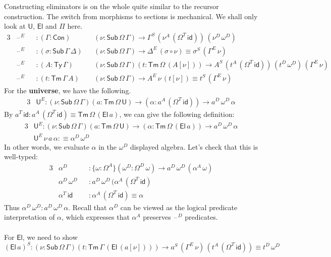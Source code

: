 \documentclass[12pt,a4paper,twoside,openany]{book}
\theoremstyle{remark}
\theoremstyle{definition}
\theoremstyle{theorem}
\newcommand{\id}{\mathsf{id}}
\newcommand{\Con}{\mathsf{Con}}
\newcommand{\Sub}{\mathsf{Sub}}
\newcommand{\Tm}{\mathsf{Tm}}
\newcommand{\Ty}{\mathsf{Ty}}
\newcommand{\U}{\mathsf{U}}
\newcommand{\El}{\mathsf{El}}
\newcommand{\blank}{\mathord{\hspace{1pt}\text{--}\hspace{1pt}}}
\newcommand{\defn}{:\equiv}
\begin{document}
Constructing eliminators is on the whole quite similar to the recursor
construction. The switch from morphisms to sections is mechanical. We shall only
look at $\U$, $\El$ and $\Pi$ here.
\begin{alignat*}{3}
  &\blank^E &&: (\Gamma : \Con)&&(\nu : \Sub\,\Omega\,\Gamma) \to \Gamma^S\,(\nu^A\,(\Omega^T\,\id))\,(\nu^D\,\omega^D)\\
  &\blank^E &&: (\sigma : \Sub\,\Gamma\,\Delta)&&(\nu : \Sub\,\Omega\,\Gamma) \to \Delta^E\,(\sigma \circ \nu) \equiv \sigma^S\,(\Gamma^E\,\nu)\\
  &\blank^E &&: (A : \Ty\,\Gamma)&&(\nu : \Sub\,\Omega\,\Gamma)(t : \Tm\,\Omega\,(A[\nu]))
     \to A^S\,(t^A\,(\Omega^T\,\id))\,(t^D\,\omega^D)\,(\Gamma^E\,\nu)\\
  &\blank^E &&: (t : \Tm\,\Gamma\,A)&&(\nu : \Sub\,\Omega\,\Gamma) \to A^E\,\nu\,(t[\nu]) \equiv t^S\,(\Gamma^E\,\nu)
\end{alignat*}
For the \textbf{universe}, we have the following.
\begin{alignat*}{3}
  &\U^E : (\nu : \Sub\,\Omega\,\Gamma)(a : \Tm\,\Omega\,\U) \to (\alpha : a^A\,(\Omega^T\,\id)) \to a^D\,\omega^D\,\alpha
\end{alignat*}
By $a^T\,\id : a^A\,(\Omega^T\,\id) \equiv \Tm\,\Omega\,(\El\,a)$, we can give the following definition:
\begin{alignat*}{3}
  &\U^E : (\nu : \Sub\,\Omega\,\Gamma)(a : \Tm\,\Omega\,\U) \to (\alpha : \Tm\,\Omega\,(\El\,a)) \to a^D\,\omega^D\,\alpha\\
  &\U^E\,\nu\,a\,\alpha \defn \alpha^D\,\omega^D
\end{alignat*}
In other words, we evaluate $\alpha$ in the $\omega^D$ displayed algebra. Let's check that this is well-typed:
\begin{alignat*}{3}
  & \alpha^D &&: \{\omega : \Omega^A\}(\omega^D : \Omega^D\,\omega) \to a^D\,\omega^D\,(\alpha^A\,\omega)\\
  & \alpha^D\,\omega^D &&: a^D\,\omega^D\,(\alpha^A\,(\Omega^T\,\id) \\
  & \alpha^T\,\id      &&: \alpha^A\,(\Omega^T\,\id) \equiv \alpha
\end{alignat*}
Thus $\alpha^D\,\omega^D : a^D\,\omega^D\,\alpha$. Recall that $\alpha^D$ can
be viewed as the logical predicate interpretation of $\alpha$, which expresses
that $\alpha^A$ preserves $\blank^D$ predicates.
\\\\
\noindent For \textbf{$\El$}, we need to show
\[
  (\El\,a)^S : (\nu : \Sub\,\Omega\,\Gamma)(t : \Tm\,\Gamma\,(\El\,(a[\nu]))) \to a^S\,(\Gamma^E\,\nu)\,(t^A\,(\Omega^T\,\id)) \equiv t^D\,\omega^D
\]
\end{document}
